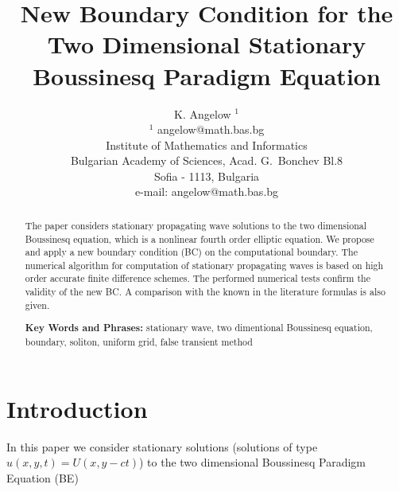 \documentclass[12pt]{article}
\theoremstyle{theorem}
\theoremstyle{defi}
\begin{document}

\title{New Boundary Condition for the Two Dimensional Stationary Boussinesq Paradigm Equation}

\author{K. Angelow $^1$ \\[6pt]
$^1$ angelow@math.bas.bg\\ 
Institute of Mathematics and Informatics\\
Bulgarian Academy of Sciences, Acad. G.~Bonchev Bl.8\\
Sofia - 1113, Bulgaria\\
e-mail: angelow@math.bas.bg\\[6pt] }

\maketitle

\begin{abstract}

The paper considers stationary propagating wave solutions to the two dimensional Boussinesq equation, which is a nonlinear fourth order elliptic equation. We propose and apply a new boundary condition (BC) on the computational boundary. The numerical algorithm for computation of stationary propagating waves is based on high order accurate finite difference schemes. The performed numerical tests confirm the validity of the new BC. A comparison with the known in the literature formulas is also given. 

\medskip


{\bf Key Words and Phrases:} stationary wave, two dimentional Boussinesq equation, boundary, soliton, uniform grid, false transient method

\end{abstract}

\section{Introduction}
In this paper we consider stationary solutions (solutions of type  $u(x,y,t)=U(x,y - ct)$) to the two dimensional Boussinesq Paradigm Equation (BE) 
\end{document}
